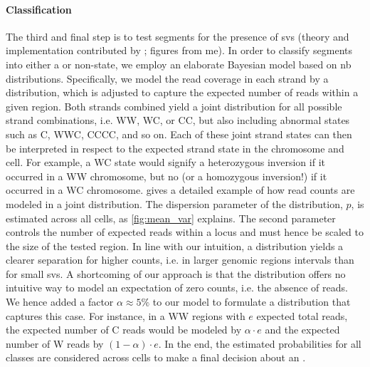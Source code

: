 \paragraph{Classification} The third and final step is to test segments for the
presence of \acp{sv} (theory and implementation contributed by \maryam; figures
from me). In order to classify segments into either a \sv or non-\sv state, we
employ an elaborate Bayesian model based on \acl{nb} distributions.
Specifically, we model the read coverage in each strand by a \nb distribution,
which is adjusted to capture the expected number of reads within a given region.
Both strands combined yield a joint distribution for all possible strand
combinations, i.e. WW, WC, or CC, but also including abnormal states such as C, WWC, CCCC,
and so on. Each of these joint strand states can then be interpreted in respect
to the expected strand state in the chromosome and cell. For example, a WC state would
signify a heterozygous inversion if it occurred in a WW chromosome, but no \sv
(or a homozygous inversion!) if it occurred in a WC chromosome.
 gives a detailed example of how read counts are modeled
in a joint \nb distribution. The dispersion parameter of the \nb distribution,
$p$, is estimated across all cells, as \cref{fig:mean_var} explains. The second
\nb parameter controls the number of expected reads within a locus and must
hence be scaled to the size of the tested region. In line with our intuition,
a \nb distribution yields a clearer separation for higher counts, i.e. in larger
genomic regions intervals than for small \acp{sv}. A shortcoming of our
approach is that the \nb distribution offers no intuitive way to model an
expectation of zero counts, i.e. the absence of reads. We hence added a factor
$\alpha \approx 5\%$ to our model to formulate a \nb distribution that captures
this case. For instance, in a WW regions with $e$ expected total reads, the
expected number of C reads would be modeled by $\alpha \cdot e$ and the expected
number of W reads by $(1-\alpha) \cdot e$. In the end, the
estimated \nb probabilities for all \sv classes are considered across cells to
make a final decision about an \sv.

